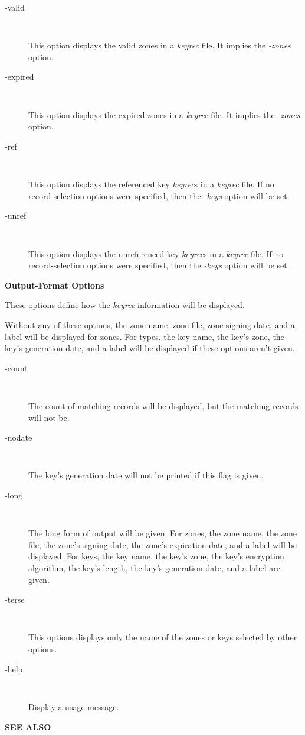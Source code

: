 \begin{description}

\item [-valid]\verb" "

This option displays the valid zones in a {\it keyrec} file.
It implies the {\it -zones} option.

\item [-expired]\verb" "

This option displays the expired zones in a {\it keyrec} file.
It implies the {\it -zones} option.

\item [-ref]\verb" "

This option displays the referenced key {\it keyrec}s in a {\it keyrec} file.
If no record-selection options were specified, then the {\it -keys} option will
be set.

\item [-unref]\verb" "

This option displays the unreferenced key {\it keyrec}s in a {\it keyrec} file.
If no record-selection options were specified, then the {\it -keys} option will
be set.

\end{description}

{\bf Output-Format Options}

These options define how the {\it keyrec} information will be displayed.

Without any of these options, the zone name, zone file, zone-signing date,
and a label will be displayed for zones.  For types, the key name, the key's
zone, the key's generation date, and a label will be displayed if these
options aren't given.

\begin{description}

\item [-count]\verb" "

The count of matching records will be displayed, but the matching records
will not be.

\item [-nodate]\verb" "

The key's generation date will not be printed if this flag is given.

\item [-long]\verb" "

The long form of output will be given.  For zones, the zone name, the zone
file, the zone's signing date, the zone's expiration date, and a label will
be displayed.  For keys, the key name, the key's zone, the key's encryption
algorithm, the key's length, the key's generation date, and a label are
given.

\item [-terse]\verb" "

This options displays only the name of the zones or keys selected by other
options.

\item [-help]\verb" "

Display a usage message.

\end{description}

{\bf SEE ALSO}


